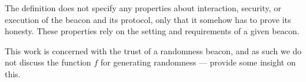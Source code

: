 
The definition does not specify any properties about interaction, security, or execution of the beacon and its protocol, only that it somehow has to prove its honesty.
These properties rely on the setting and requirements of a given beacon.

This work is concerned with the trust of a randomness beacon, and as such we do not discuss the function $f$ for generating randomness --- \citet{bonneau2015bitcoin} provide some insight on this.
